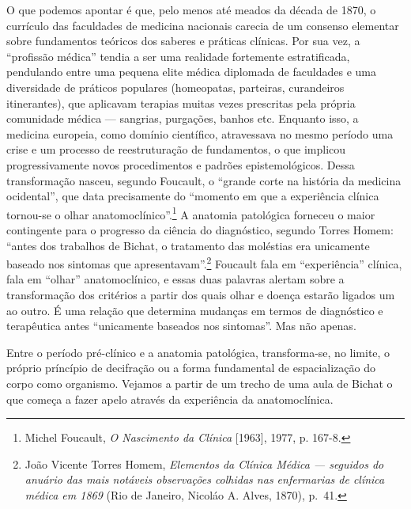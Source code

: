 O que podemos apontar é que, pelo menos até meados da década de 1870, o
currículo das faculdades de medicina nacionais carecia de um consenso
elementar sobre fundamentos teóricos dos saberes e práticas clínicas.
Por sua vez, a ``profissão médica'' tendia a ser uma realidade
fortemente estratificada, pendulando entre uma pequena elite médica
diplomada de faculdades e uma diversidade de práticos populares
(homeopatas, parteiras, curandeiros itinerantes), que aplicavam terapias
muitas vezes prescritas pela própria comunidade médica --- sangrias,
purgações, banhos etc. Enquanto isso, a medicina europeia, como domínio
científico, atravessava no mesmo período uma crise e um processo de
reestruturação de fundamentos, o que implicou progressivamente novos
procedimentos e padrões epistemológicos. Dessa transformação nasceu,
segundo Foucault, o ``grande corte na história da medicina ocidental'',
que data precisamente do ``momento em que a experiência clínica
tornou-se o olhar anatomoclínico''.\footnote{Michel Foucault, \textit{O
  Nascimento da Clínica} {[}1963{]}, 1977, p. 167-8.} A anatomia
patológica forneceu o maior contingente para o progresso da ciência do
diagnóstico, segundo Torres Homem: ``antes dos trabalhos de Bichat, o
tratamento das moléstias era unicamente baseado nos sintomas que
apresentavam''.\footnote{João Vicente Torres Homem, \textit{Elementos da
  Clínica Médica --- seguidos do anuário das mais notáveis observações
  colhidas nas enfermarias de clínica médica em 1869} (Rio de Janeiro,
  Nicoláo A. Alves, 1870), p.~41.} Foucault fala em ``experiência''
clínica, fala em ``olhar'' anatomoclínico, e essas duas palavras alertam
sobre a transformação dos critérios a partir dos quais olhar e doença
estarão ligados um ao outro. É uma relação que determina mudanças em
termos de diagnóstico e terapêutica antes ``unicamente baseados nos
sintomas''. Mas não apenas.

Entre o período pré-clínico e a anatomia patológica, transforma-se, no
limite, o próprio príncípio de decifração ou a forma fundamental de
espacialização do corpo como organismo. Vejamos a partir de um trecho de
uma aula de Bichat o que começa a fazer apelo através da experiência da
anatomoclínica.

